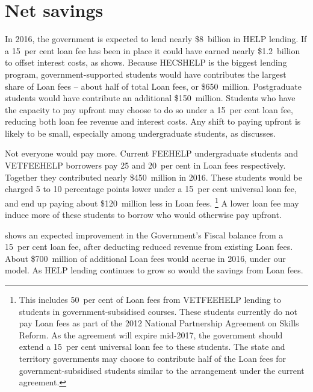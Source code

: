 \documentclass[embargoed]{grattan}
\begin{document}
\section{Net savings}\label{net-savings}

In 2016, the government is expected to lend nearly \$8~billion in \gls{HELP} lending.
If a 15~per cent loan fee has been in place it could have earned nearly \$1.2~billion to offset interest costs, as  shows.
Because \gls{HECSHELP} is the biggest lending program, government-supported students would have contributes the largest share of \gls{Loan fees} -- about half of total \gls{Loan fees}, or \$650~million.
Postgraduate students would have contribute an additional \$150~million.
Students who have the capacity to pay upfront may choose to do so under a 15~per cent loan fee, reducing both loan fee revenue and interest costs.
Any shift to paying upfront is likely to be small, especially among undergraduate students, as  discusses.

Not everyone would pay more.
Current \gls{FEEHELP} undergraduate students and \gls{VETFEEHELP} borrowers pay 25 and 20~per cent in \gls{Loan fees} respectively.
Together they contributed nearly \$450~million in 2016.
These students would be charged 5 to 10 percentage points lower under a 15~per cent universal loan fee, and end up paying about \$120~million less in \gls{Loan fees}.%
\footnote{This includes 50~per cent of \gls{Loan fees} from \gls{VETFEEHELP} lending to students in government-subsidised courses.
These students currently do not pay \gls{Loan fees} as part of the 2012 National Partnership Agreement on Skills Reform.
As the agreement will expire mid-2017, the government should extend a 15~per cent universal loan fee to these students.
The state and territory governments may choose to contribute half of the \gls{Loan fees} for government-subsidised students similar to the arrangement under the current agreement.} A lower loan fee may induce more of these students to borrow who would otherwise pay upfront.

 shows an expected improvement in the Government's \gls{Fiscal balance} from a 15~per cent loan fee, after deducting reduced revenue from existing \gls{Loan fees}.
About \$700~million of additional \gls{Loan fees} would accrue in 2016, under our model.
As \gls{HELP} lending continues to grow so would the savings from \gls{Loan fees}.
\end{document}
